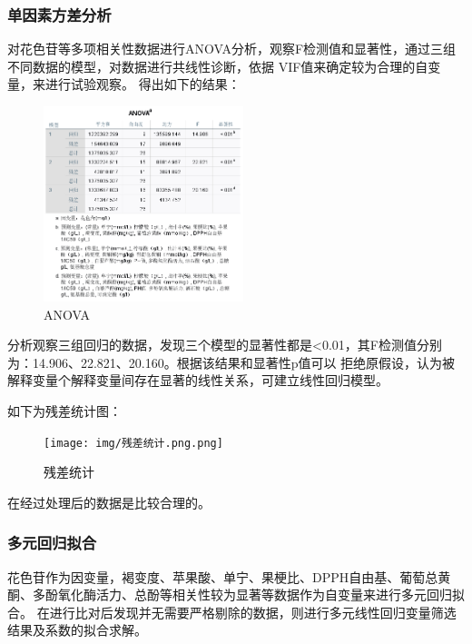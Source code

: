 \documentclass[UTF8]{ctexart}
\begin{document}
					   \subsubsection{单因素方差分析}
					   		对花色苷等多项相关性数据进行ANOVA分析，观察F检测值和显著性，通过三组不同数据的模型，对数据进行共线性诊断，依据
							VIF值来确定较为合理的自变量，来进行试验观察。
							得出如下的结果：
							\begin{figure}[!htbp]\centering
								\includegraphics[width=0.52\textwidth,height=0.45\textwidth]{img/ANOVA.png} %
								\caption{ANOVA} %
								\label{fig:figure 5} %
								\end{figure}

							分析观察三组回归的数据，发现三个模型的显著性都是<0.01，其F检测值分别为：14.906、22.821、20.160。根据该结果和显著性p值可以
							拒绝原假设，认为被解释变量个解释变量间存在显著的线性关系，可建立线性回归模型。
							
							如下为残差统计图：
							\begin{figure}[H]\centering
								\texttt{[image: img/残差统计.png.png]} %
								\caption{残差统计} %
								\label{fig:figure 6} %
								\end{figure}
								在经过处理后的数据是比较合理的。

							\subsubsection{多元回归拟合}
							花色苷作为因变量，褐变度、苹果酸、单宁、果梗比、DPPH自由基、葡萄总黄酮、多酚氧化酶活力、总酚等相关性较为显著等数据作为自变量来进行多元回归拟合。
							在进行比对后发现并无需要严格剔除的数据，则进行多元线性回归变量筛选结果及系数的拟合求解。

					



					
\end{document}
